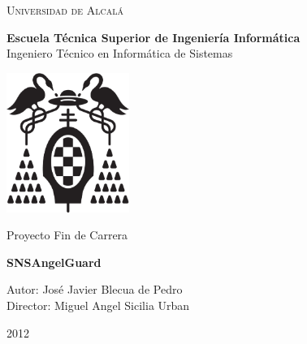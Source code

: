 \begin{center}

\setcounter{page}{0}


\large\textsc{Universidad de Alcalá}\\
\vspace{0.5cm}

\textbf{Escuela Técnica Superior de Ingeniería Informática}\\

Ingeniero Técnico en Informática de Sistemas\\
\end{center}

\vspace{0.5cm}


\begin{center}
\includegraphics[width=4cm]{Figuras/LogoUAH.eps}
\end{center}


\begin{center}
\vspace{1cm}

\large Proyecto Fin de Carrera\\

\vspace{0.5cm}

\textbf{\large {{SNSAngelGuard}}}\\

\vspace{1.5cm}

\large Autor: José Javier Blecua de Pedro\\
Director: Miguel Angel Sicilia Urban\\

\vspace{1.5cm}

\large 2012\\
\end{center}

